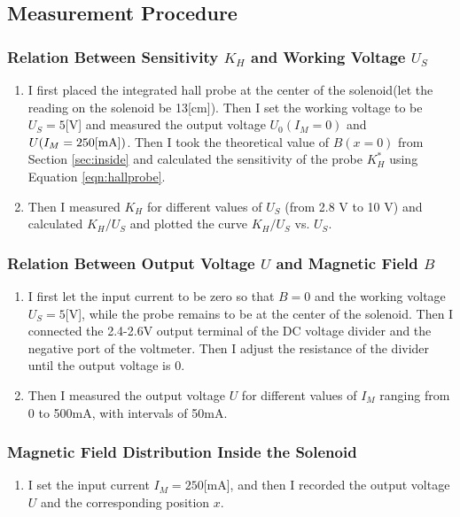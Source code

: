 \documentclass[a4paper]{article}
\begin{document}
    \subsection{Measurement Procedure}
    \subsubsection{Relation Between Sensitivity \(K_H\) and Working Voltage \(U_S\)}
    \begin{enumerate}
        \item I first placed the integrated hall probe at the center of the solenoid(let the reading on the solenoid be 13[cm]). Then I set the working voltage to be $U_S=5$[V] and measured the output voltage $U_0(I_M=0)$ and $U(I_M=250\rm [mA])$. Then I took the theoretical value of $B(x = 0)$ from Section \ref{sec:inside} and calculated the sensitivity of the probe $K_H^*$ using Equation \ref{eqn:hallprobe}.
        \item Then I measured $K_H$ for different values of $U_S$ (from 2.8 V to 10 V) and calculated $K_H/U_S$ and plotted the curve $K_H/U_S$ vs. $U_S$.
    \end{enumerate}
    \subsubsection{Relation Between Output Voltage $U$ and Magnetic Field $B$}
    \begin{enumerate}
        \item I first let the input current to be zero so that $B=0$ and the working voltage $U_S=5$[V], while the probe remains to be at the center of the solenoid. Then I connected the 2.4-2.6V output terminal of the DC voltage divider and the negative port of the voltmeter. Then I adjust the resistance of the divider until the output voltage is 0.
        \item Then I measured the output voltage $U$ for different values of $I_M$ ranging from 0 to 500mA, with intervals of 50mA.
    \end{enumerate}
    \subsubsection{Magnetic Field Distribution Inside the Solenoid}
    \begin{enumerate}
        \item I set the input current $I_M=250$[mA], and then I recorded the output voltage $U$ and the corresponding position $x$.
    \end{enumerate}
\end{document}
